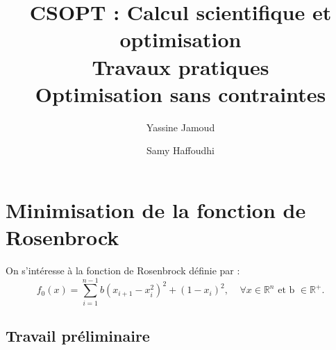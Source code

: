 \documentclass[12pt,a4paper,titlepage]{article}
\title{CSOPT : Calcul scientifique et optimisation \\ Travaux pratiques \\ Optimisation sans contraintes }
\author{Yassine Jamoud \and Samy Haffoudhi}
\begin{document}
\maketitle

\newpage

\section{Minimisation de la fonction de Rosenbrock}

On s'intéresse à la fonction de Rosenbrock définie par :
$$
f_0(x)= \sum_{i=1}^{n-1} b(x_{i+1}-x_i^2)^2 + (1-x_i)^2, \;\;\;\;    \forall x \in \mathbb{R}^n \mbox{ et b }  \in \mathbb{R}^+.
$$
\subsection{Travail préliminaire}
\end{document}
